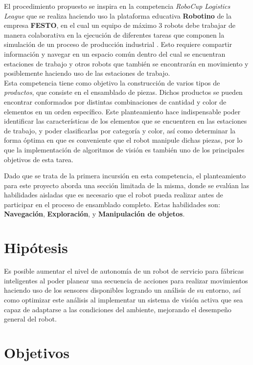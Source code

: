 El procedimiento propuesto se inspira en la competencia \textit{RoboCup Logistics League} que se realiza haciendo uso la plataforma educativa \textbf{Robotino} de la empresa \textbf{FESTO}, en el cual un equipo de máximo 3 robots debe trabajar de manera colaborativa en la ejecución de diferentes tareas que componen la simulación de un proceso de producción industrial \cite{robocup__mathworks_robocup_2022}. Esto requiere compartir información y navegar en un espacio común dentro del cual se encuentran estaciones de trabajo y otros robots que también se encontrarán en movimiento y posiblemente haciendo uso de las estaciones de trabajo.\\

Esta competencia tiene como objetivo la construcción de varios tipos de \textit{productos}, que consiste en el ensamblado de piezas. Dichos productos se pueden encontrar conformados por distintas combinaciones de cantidad y color de elementos en un orden específico. Este planteamiento hace indispensable poder identificar las características de los elementos que se encuentren en las estaciones de trabajo, y poder clasificarlas por categoría y color, así como determinar la forma óptima en que es conveniente que el robot manipule dichas piezas, por lo que la implementación de algoritmos de visión es también uno de los principales objetivos de esta tarea.

Dado que se trata de la primera incursión en esta competencia, el planteamiento para este proyecto aborda una sección limitada de la misma, donde se evalúan las habilidades aisladas que es necesario que el robot pueda realizar antes de participar en el proceso de ensamblado completo. Estas habilidades son: \textbf{Navegación}, \textbf{Exploración}, y \textbf{Manipulación de objetos}. 

\section{Hipótesis}
Es posible aumentar el nivel de autonomía de un robot de servicio para fábricas inteligentes al poder planear una secuencia de acciones para realizar movimientos haciendo uso de los sensores disponibles logrando un análisis de su entorno, así como optimizar este análisis al implementar un sistema de visión activa que sea capaz de adaptarse a las condiciones del ambiente, mejorando el desempeño general del robot.

\section{Objetivos}
